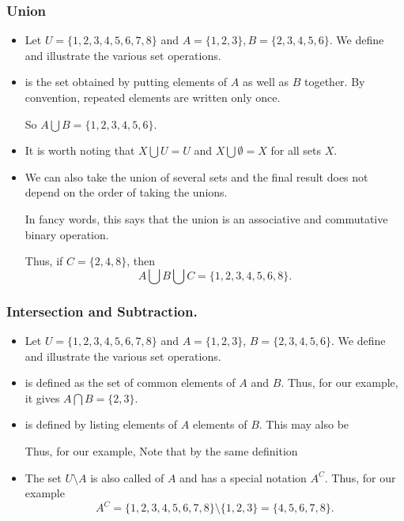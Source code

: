 \begin{frame}%
  \frametitle{Union}
  \begin{itemize}%

\item
Let $U=\{1,2,3,4,5,6,7,8\}$ and $A=\{1,2,3\}, B=\{2,3,4,5,6\}$.
We define and illustrate the various set operations.

\item {} is the set obtained by putting elements of $A$
as well as $B$ together. By convention, repeated elements are written
only once.

So $A\bigcup B = \{ 1,2,3,4,5,6\}$.

\item It is worth noting that  $X\bigcup U=U$ and $X\bigcup
\emptyset = X$ for all sets $X$.

\item We can also take the union of several sets and the final result
does not depend on the order of taking the unions.

In fancy words, this says that the union is an associative and  commutative
binary operation.

Thus, if $C=\{2,4,8\}$, then
$$A\bigcup B \bigcup C = \{1,2,3,4,5,6,8\}.$$


\end{itemize}
\pause
\end{frame}
%


\begin{frame}%
  \frametitle{Intersection and Subtraction.}
  \begin{itemize}%

\item
Let $U=\{1,2,3,4,5,6,7,8\}$ and $A=\{1,2,3\}$, $B=\{2,3,4,5,6\}$.
We define and illustrate the various set operations.

\item {} is defined as the set of common elements of $A$
and $B$. Thus, for our example, it gives $A\bigcap B = \{2,3\}$.

\item {} is defined by listing elements of $A$   elements of $B$.
This may also be 

Thus, for our example, 
Note that  by the same definition 

\item The set $U\setminus A$ is also called  of $A$
and has a special notation $A^C$.
Thus, for our example $$A^C = \{1,2,3,4,5,6,7,8\} \setminus
\{1,2,3\} = \{4,5,6,7,8\}.$$


\end{itemize}
\pause
\end{frame}

